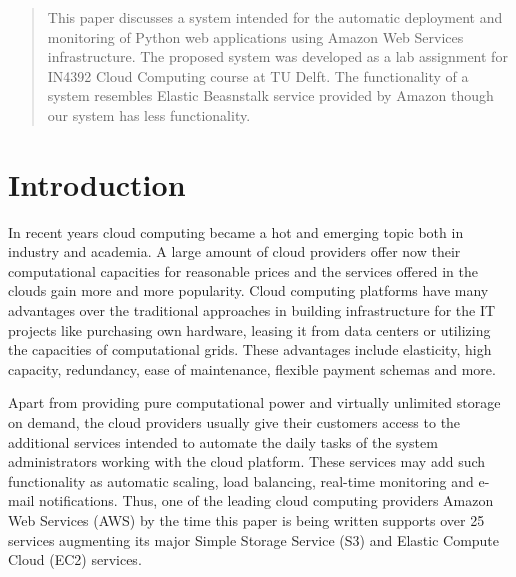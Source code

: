 \documentclass[conference]{IEEEtran}
\begin{document}
\begin{abstract}
This paper discusses a system intended for the automatic deployment and monitoring of Python web applications using Amazon Web Services infrastructure. The proposed system was developed as a lab assignment for IN4392 Cloud Computing course at TU Delft. The functionality of a system resembles Elastic Beasnstalk service provided by Amazon though our system has less functionality. 
\end{abstract}





%
\IEEEpeerreviewmaketitle



\section{Introduction}

In recent years cloud computing became a hot and emerging topic both in industry and academia. A large amount of cloud providers offer now their computational capacities for reasonable prices and the services offered in the clouds gain more and more popularity. Cloud computing platforms have many advantages over the traditional approaches in building infrastructure for the IT projects like purchasing own hardware, leasing it from data centers or utilizing the capacities of computational grids. These advantages include elasticity, high capacity, redundancy, ease of maintenance, flexible payment schemas and more. 

Apart from providing pure computational power and virtually unlimited storage on demand, the cloud providers usually give their customers access to the additional services intended to automate the daily tasks of the system administrators working with the cloud platform. These services may add such functionality as automatic scaling, load balancing, real-time monitoring and e-mail notifications. Thus, one of the leading cloud computing providers Amazon Web Services (AWS) by the time this paper is being written supports over 25 services augmenting its major Simple Storage Service (S3) and Elastic Compute Cloud (EC2) services. 
\end{document}
